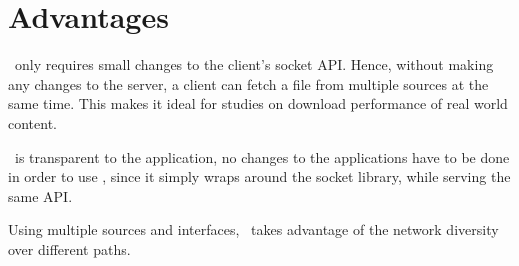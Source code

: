 \section{Advantages}
\label{sec:vanilla-advantages}

 \protoold~only requires small changes to the client's socket API. 
Hence, without making any changes to the server, a client can fetch a file from multiple sources at the same time. 
This makes it ideal for studies on download performance of real world content. 

 \protoold~is transparent to the application, \ie no changes to the applications have to be done in order to use \mhttp, since it simply wraps around the socket library, while serving the same API. 

 Using multiple sources and interfaces, \mhttp~takes advantage of the network diversity over different paths.
